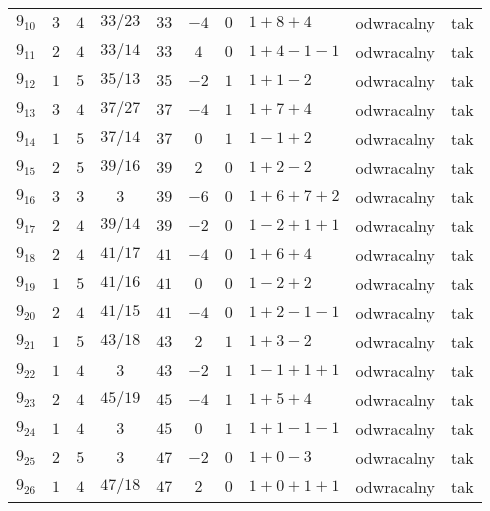 \begin{longtable}{lccccccllc}
$9_{10}$    &  $3$     &  $4$  &  $33/23$  &  $33$   &  $-4$  &  $0$  &  $1+8+4$        &  odwracalny  &  tak  \\
$9_{11}$    &  $2$     &  $4$  &  $33/14$  &  $33$   &  $4$   &  $0$  &  $1+4-1-1$      &  odwracalny  &  tak  \\
$9_{12}$    &  $1$     &  $5$  &  $35/13$  &  $35$   &  $-2$  &  $1$  &  $1+1-2$        &  odwracalny  &  tak  \\
$9_{13}$    &  $3$     &  $4$  &  $37/27$  &  $37$   &  $-4$  &  $1$  &  $1+7+4$        &  odwracalny  &  tak  \\
$9_{14}$    &  $1$     &  $5$  &  $37/14$  &  $37$   &  $0$   &  $1$  &  $1-1+2$        &  odwracalny  &  tak  \\
$9_{15}$    &  $2$     &  $5$  &  $39/16$  &  $39$   &  $2$   &  $0$  &  $1+2-2$        &  odwracalny  &  tak  \\
$9_{16}$    &  $3$     &  $3$  &  $3$      &  $39$   &  $-6$  &  $0$  &  $1+6+7+2$      &  odwracalny  &  tak  \\
$9_{17}$    &  $2$     &  $4$  &  $39/14$  &  $39$   &  $-2$  &  $0$  &  $1-2+1+1$      &  odwracalny  &  tak  \\
$9_{18}$    &  $2$     &  $4$  &  $41/17$  &  $41$   &  $-4$  &  $0$  &  $1+6+4$        &  odwracalny  &  tak  \\
$9_{19}$    &  $1$     &  $5$  &  $41/16$  &  $41$   &  $0$   &  $0$  &  $1-2+2$        &  odwracalny  &  tak  \\
$9_{20}$    &  $2$     &  $4$  &  $41/15$  &  $41$   &  $-4$  &  $0$  &  $1+2-1-1$      &  odwracalny  &  tak  \\
$9_{21}$    &  $1$     &  $5$  &  $43/18$  &  $43$   &  $2$   &  $1$  &  $1+3-2$        &  odwracalny  &  tak  \\
$9_{22}$    &  $1$     &  $4$  &  $3$      &  $43$   &  $-2$  &  $1$  &  $1-1+1+1$      &  odwracalny  &  tak  \\
$9_{23}$    &  $2$     &  $4$  &  $45/19$  &  $45$   &  $-4$  &  $1$  &  $1+5+4$        &  odwracalny  &  tak  \\
$9_{24}$    &  $1$     &  $4$  &  $3$      &  $45$   &  $0$   &  $1$  &  $1+1-1-1$      &  odwracalny  &  tak  \\
$9_{25}$    &  $2$     &  $5$  &  $3$      &  $47$   &  $-2$  &  $0$  &  $1+0-3$        &  odwracalny  &  tak  \\
$9_{26}$    &  $1$     &  $4$  &  $47/18$  &  $47$   &  $2$   &  $0$  &  $1+0+1+1$      &  odwracalny  &  tak  \\

\end{longtable}
